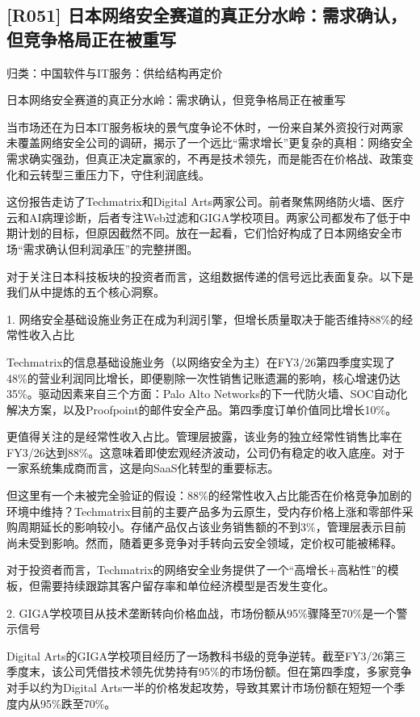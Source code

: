 \documentclass[11pt]{ctexart}
\begin{document}
\subsection{[R051] 日本网络安全赛道的真正分水岭：需求确认，但竞争格局正在被重写}
{\small\color{refgray}归类：中国软件与IT服务：供给结构再定价}

日本网络安全赛道的真正分水岭：需求确认，但竞争格局正在被重写

当市场还在为日本IT服务板块的景气度争论不休时，一份来自某外资投行对两家未覆盖网络安全公司的调研，揭示了一个远比“需求增长”更复杂的真相：网络安全需求确实强劲，但真正决定赢家的，不再是技术领先，而是能否在价格战、政策变化和云转型三重压力下，守住利润底线。

这份报告走访了Techmatrix和Digital Arts两家公司。前者聚焦网络防火墙、医疗云和AI病理诊断，后者专注Web过滤和GIGA学校项目。两家公司都发布了低于中期计划的目标，但原因截然不同。放在一起看，它们恰好构成了日本网络安全市场“需求确认但利润承压”的完整拼图。

对于关注日本科技板块的投资者而言，这组数据传递的信号远比表面复杂。以下是我们从中提炼的五个核心洞察。

1. 网络安全基础设施业务正在成为利润引擎，但增长质量取决于能否维持88\%的经常性收入占比

Techmatrix的信息基础设施业务（以网络安全为主）在FY3/26第四季度实现了48\%的营业利润同比增长，即便剔除一次性销售记账遗漏的影响，核心增速仍达35\%。驱动因素来自三个方面：Palo Alto Networks的下一代防火墙、SOC自动化解决方案，以及Proofpoint的邮件安全产品。第四季度订单价值同比增长10\%。

更值得关注的是经常性收入占比。管理层披露，该业务的独立经常性销售比率在FY3/26达到88\%。这意味着即使宏观经济波动，公司仍有稳定的收入底座。对于一家系统集成商而言，这是向SaaS化转型的重要标志。

但这里有一个未被完全验证的假设：88\%的经常性收入占比能否在价格竞争加剧的环境中维持？Techmatrix目前的主要产品多为云原生，受内存价格上涨和零部件采购周期延长的影响较小。存储产品仅占该业务销售额的不到3\%，管理层表示目前尚未受到影响。然而，随着更多竞争对手转向云安全领域，定价权可能被稀释。

对于投资者而言，Techmatrix的网络安全业务提供了一个“高增长+高粘性”的模板，但需要持续跟踪其客户留存率和单位经济模型是否发生变化。

2. GIGA学校项目从技术垄断转向价格血战，市场份额从95\%骤降至70\%是一个警示信号

Digital Arts的GIGA学校项目经历了一场教科书级的竞争逆转。截至FY3/26第三季度末，该公司凭借技术领先优势持有95\%的市场份额。但在第四季度，多家竞争对手以约为Digital Arts一半的价格发起攻势，导致其累计市场份额在短短一个季度内从95\%跌至70\%。
\end{document}
